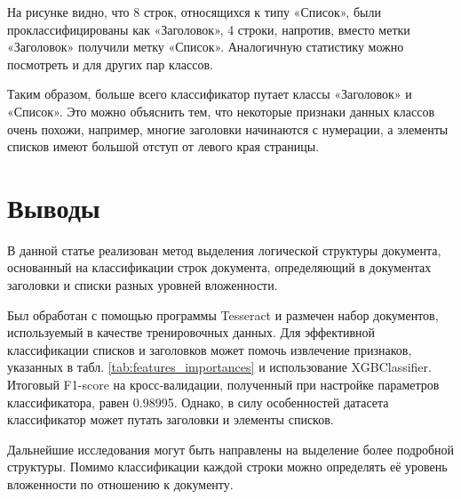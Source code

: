 \documentclass{ProcISPRAS}
\begin{document}
На рисунке видно, что 8 строк, относящихся к типу «Список», были проклассифицированы как «Заголовок», 4 строки, напротив, вместо метки «Заголовок» получили метку «Список». Аналогичную статистику можно посмотреть и для других пар классов.

Таким образом, больше всего классификатор путает классы «Заголовок» и «Список». Это можно объяснить тем, что некоторые признаки данных классов очень похожи, например, многие заголовки начинаются с нумерации, а элементы списков имеют большой отступ от левого края страницы.

\section{Выводы}

В данной статье реализован метод выделения логической структуры документа, основанный на классификации строк документа, определяющий в документах заголовки и списки разных уровней вложенности.

Был обработан с помощью программы Tesseract и размечен набор документов, используемый в качестве тренировочных данных. Для эффективной классификации списков и заголовков может помочь извлечение признаков, указанных в табл. \ref{tab:features_importances} и использование XGBClassifier. Итоговый F1-score на кросс-валидации, полученный при настройке параметров классификатора, равен 0.98995. Однако, в силу особенностей датасета классификатор может путать заголовки и элементы списков.

Дальнейшие исследования могут быть направлены на выделение более подробной структуры. Помимо классификации каждой строки можно определять её уровень вложенности по отношению к документу.

\printbibliography
\end{document}
